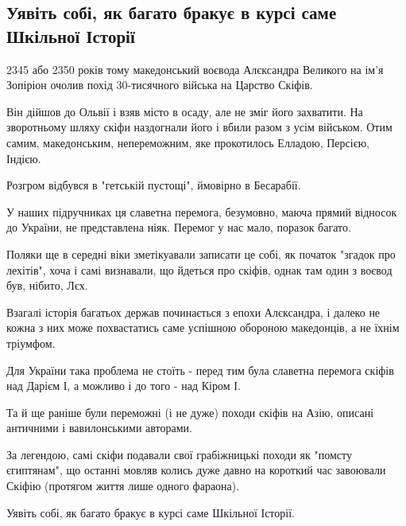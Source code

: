  
 
 
 
 
\subsection{Уявіть собі, як багато бракує в курсі саме Шкільної Історії}

2345 або 2350 років тому македонський воєвода Алєксандра Великого на ім'я
Зопіріон очолив похід 30-тисячного війська на Царство Скіфів. 

Він дійшов до Ольвії і взяв місто в осаду, але не зміг його захватити. На
зворотньому шляху скіфи наздогнали його і вбили разом з усім військом. Отим
самим, македонським, непереможним, яке прокотилось Елладою, Персією, Індією. 

Розгром відбувся в "гетській пустощі", ймовірно в Бесарабії. 

У наших підручниках ця славетна перемога, безумовно, маюча прямий відносок до
України, не представлена ніяк. Перемог у нас мало, поразок багато. 

Поляки ще в середні віки зметікуавали записати це собі, як початок "згадок про
лехітів", хоча і самі визнавали, що йдеться про скіфів, однак там один з воєвод
був, нібито, Лєх.

Взагалі історія багатьох держав починається з епохи Алєксандра, і далеко не
кожна з них може похвастатись саме успішною обороною македонців, а не їхнім
тріумфом. 

Для України така проблема не стоїть - перед тим була славетна перемога скіфів над Дарієм І, а можливо і до того - над Кіром І. 

Та й ще раніше були переможні (і не дуже) походи скіфів на Азію, описані
античними і вавилонськими авторами. 

За легендою, самі скіфи подавали свої грабіжницькі походи як "помсту
єгиптянам", що останні мовляв колись дуже давно на короткий час завоювали
Скіфію (протягом життя лише одного фараона). 

Уявіть собі, як багато бракує в курсі саме Шкільної Історії. 

